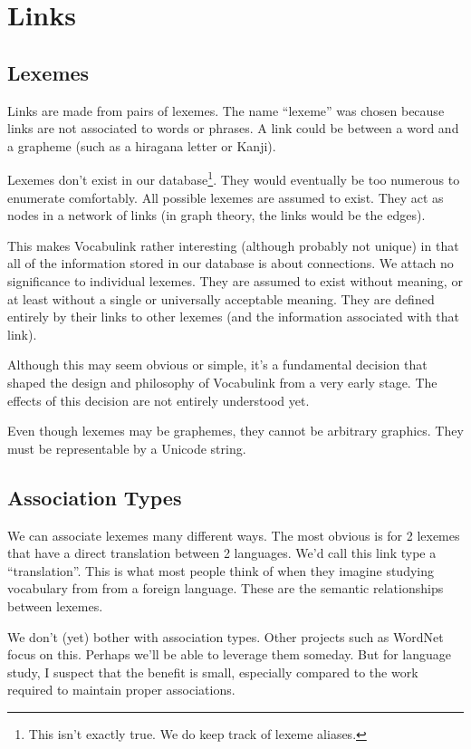 \chapter{Links}

\section{Lexemes}

Links are made from pairs of lexemes. The name ``lexeme'' was chosen because
links are not associated to words or phrases. A link could be between a word
and a grapheme (such as a hiragana letter or Kanji).

Lexemes don't exist in our database\footnote{This isn't exactly true. We do
keep track of lexeme aliases.}. They would eventually be too numerous to
enumerate comfortably. All possible lexemes are assumed to exist. They act as
nodes in a network of links (in graph theory, the links would be the edges).

This makes Vocabulink rather interesting (although probably not unique) in that
all of the information stored in our database is about connections. We attach
no significance to individual lexemes. They are assumed to exist without
meaning, or at least without a single or universally acceptable meaning. They
are defined entirely by their links to other lexemes (and the information
associated with that link).

Although this may seem obvious or simple, it's a fundamental decision that
shaped the design and philosophy of Vocabulink from a very early stage. The
effects of this decision are not entirely understood yet.

Even though lexemes may be graphemes, they cannot be arbitrary graphics. They
must be representable by a Unicode string.

\section{Association Types}

We can associate lexemes many different ways. The most obvious is for 2 lexemes
that have a direct translation between 2 languages. We'd call this link type a
``translation''. This is what most people think of when they imagine studying
vocabulary from from a foreign language. These are the semantic relationships
between lexemes.

We don't (yet) bother with association types. Other projects such as WordNet
focus on this. Perhaps we'll be able to leverage them someday. But for language
study, I suspect that the benefit is small, especially compared to the work
required to maintain proper associations.

